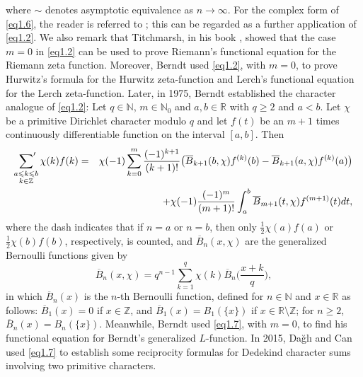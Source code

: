 \documentclass[reqno]{amsart}
\numberwithin{equation}{section}
\begin{document}
where $\sim$ denotes asymptotic equivalence as $n\rightarrow\infty$. For the complex form of \eqref{eq1.6}, the reader is referred to \cite[Proposition 9.6.27]{cohen}; this can be regarded as a further application of \eqref{eq1.2}. We also remark that Titchmarsh, in his book \cite[pp. 13--15]{titchmarsh}, showed that the case $m=0$ in \eqref{eq1.2} can be used to prove Riemann's functional equation \cite{riemann} for the Riemann zeta function. Moreover, Berndt \cite{berndt1,berndt2} used \eqref{eq1.2}, with $m=0$, to prove Hurwitz's formula \cite{hurwitz} for the Hurwitz zeta-function and Lerch's functional equation \cite{lerch} for the Lerch zeta-function. Later, in 1975, Berndt \cite[Theorem 4.1]{berndt3} established the character analogue of \eqref{eq1.2}: Let $q\in\mathbb{N}$, $m\in\mathbb{N}_{0}$ and $a,b\in\mathbb{R}$ with $q\geqslant2$ and $a<b$. Let $\chi$ be a primitive Dirichlet character modulo $q$ and let $f(t)$ be an $m+1$
times continuously differentiable function on the interval $[a,b]$. Then
\begin{eqnarray}\label{eq1.7}
\sideset{}{'}\sum_{\substack{a\leqslant k\leqslant b\\k\in\mathbb{Z}}}\chi(k)f(k)&=&\chi(-1)\sum_{k=0}^{m}\frac{(-1)^{k+1}}{(k+1)!}\bigl(\overline{B}_{k+1}(b,\chi)f^{(k)}(b)-\overline{B}_{k+1}(a,\chi)f^{(k)}(a)\bigl)\nonumber\\
&&+\chi(-1)\frac{(-1)^{m}}{(m+1)!}\int_{a}^{b}\overline{B}_{m+1}(t,\chi)f^{(m+1)}(t)dt,
\end{eqnarray}
where the dash indicates that if $n=a$ or $n=b$, then only $\frac{1}{2}\chi(a)f(a)$ or $\frac{1}{2}\chi(b)f(b)$, respectively, is
counted, and $\overline{B}_{n}(x,\chi)$ are the generalized Bernoulli functions given by
\begin{equation*}
\overline{B}_{n}(x,\chi)=q^{n-1}\sum_{k=1}^{q}\chi(k)\overline{B}_{n}\biggl(\frac{x+k}{q}\biggl),
\end{equation*}
in which $\overline{B}_{n}(x)$ is the $n$-th Bernoulli function, defined for $n\in\mathbb{N}$ and $x\in\mathbb{R}$ as follows: $\overline{B}_{1}(x)=0$ if $x\in\mathbb{Z}$, and $\overline{B}_{1}(x)=B_{1}(\{x\})$ if $x\in\mathbb{R}\setminus\mathbb{Z}$; for $n\geqslant2$, $\overline{B}_{n}(x)=B_{n}(\{x\})$. Meanwhile, Berndt \cite[Theorem 5.1]{berndt3} used \eqref{eq1.7}, with $m=0$, to find his functional equation for Berndt's generalized $L$-function. In 2015, Da\u{g}l{\i} and Can \cite[Theorems 1 and 2]{dagli} used \eqref{eq1.7} to establish some reciprocity formulas for Dedekind character sums involving two primitive characters.
\end{document}
